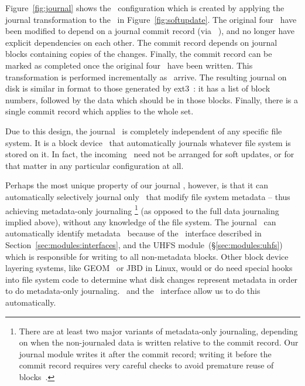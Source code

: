 Figure~\ref{fig:journal} shows the \chdesc\ configuration which is created
by applying the journal transformation to the \chdescs\ in
Figure~\ref{fig:softupdate}. The original four \chdescs\ have been
modified to depend on a journal commit record (via \anoop\ \chdesc), and
no longer have explicit dependencies on each other. The commit record
depends on journal blocks containing copies of the changes. Finally, the
commit record can be marked as completed once the original four \chdescs\
have been written. This transformation is performed incrementally as
\chdescs\ arrive. The resulting journal on disk is similar in format to
those generated by ext3~\cite{tweedie98journaling}: it has a list of block
numbers, followed by the data which should be in those blocks. Finally,
there is a single commit record which applies to the whole set.

Due to this design, the journal \module\ is completely independent of any
specific file system. It is a block device \module\ that automatically journals
whatever file system is stored on it. In fact, the incoming \chdescs\ need not
be arranged for soft updates, or for that matter in any particular configuration
at all.

Perhaps the most unique property of our journal \module, however, is that it can
automatically selectively journal only \chdescs\ that modify file system
metadata -- thus achieving metadata-only journaling \footnote{There are at least
two major variants of metadata-only journaling, depending on when the
non-journaled data is written relative to the commit record. Our journal module
writes it after the commit record; writing it before the commit record requires
very careful checks to avoid premature reuse of blocks~\cite{tweedie00ext3}.}
(as opposed to the full data journaling implied above), without any knowledge of
the file system.
%
The journal \module\ can automatically identify metadata \chdescs\ because of
the \LFS\ interface described in Section~\ref{sec:modules:interfaces}, and the
UHFS module~(\S\ref{sec:modules:uhfs}) which is responsible for writing to all
non-metadata blocks. Other block device layering systems, like GEOM~\cite{geom}
or JBD in Linux, would or do need special hooks into file system code to
determine what disk changes represent metadata in order to do metadata-only
journaling. \Chdescs\ and the \LFS\ interface allow us to do this automatically.
